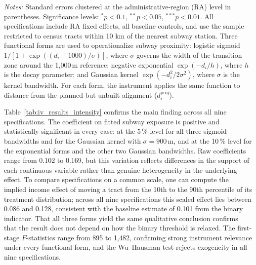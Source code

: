 \begin{table}[htbp]
{{\begin{tabular}{lrrr rrr rrr}
\bottomrule
\end{tabular}%
}}
\begin{tablenotes}
\scriptsize
\item \textit{Notes:} Standard errors clustered at the administrative-region (RA) level in parentheses. Significance levels: $^{*}p<0.1$, $^{**}p<0.05$, $^{***}p<0.01$. All specifications include RA fixed effects, all baseline controls, and use the sample restricted to census tracts within 10 km of the nearest subway station. Three functional forms are used to operationalize subway proximity: logistic sigmoid $1/[1+\exp((d_i-1000)/\sigma)]$, where $\sigma$ governs the width of the transition zone around the 1,000\,m reference; negative exponential $\exp(-d_i/h)$, where $h$ is the decay parameter; and Gaussian kernel $\exp(-d_i^2/2\sigma^2)$, where $\sigma$ is the kernel bandwidth. For each form, the instrument applies the same function to distance from the planned but unbuilt alignment ($d_i^{\mathrm{proj}}$).
\end{tablenotes}
\end{table}

Table~\ref{tab:iv_results_intensity} confirms the main finding across all nine specifications. The coefficient on fitted subway exposure is positive and statistically significant in every case: at the 5\,\% level for all three sigmoid bandwidths and for the Gaussian kernel with $\sigma = 900$\,m, and at the 10\,\% level for the exponential forms and the other two Gaussian bandwidths. Raw coefficients range from 0.102 to 0.169, but this variation reflects differences in the support of each continuous variable rather than genuine heterogeneity in the underlying effect. To compare specifications on a common scale, one can compute the implied income effect of moving a tract from the 10th to the 90th percentile of its treatment distribution; across all nine specifications this scaled effect lies between 0.086 and 0.128, consistent with the baseline estimate of 0.101 from the binary indicator. That all three forms yield the same qualitative conclusion confirms that the result does not depend on how the binary threshold is relaxed. The first-stage $F$-statistics range from 895 to 1,482, confirming strong instrument relevance under every functional form, and the Wu--Hausman test rejects exogeneity in all nine specifications.

\vspace{0.75cm}

